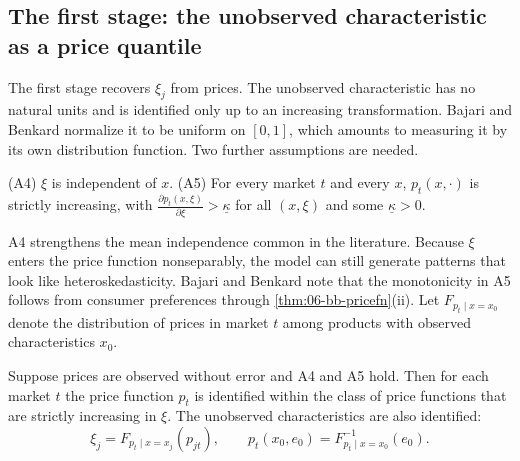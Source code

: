 \subsection{The first stage: the unobserved characteristic as a price quantile}\label{sec:06-bb-firststage}

The first stage recovers $\xi_j$ from prices. The unobserved characteristic has no natural units and is identified only up
to an increasing transformation. Bajari and Benkard normalize it to be uniform on $[0,1]$, which amounts to measuring it by
its own distribution function. Two further assumptions are needed.

\begin{assumption}\label{ass:06-bb-indep}
(A4) $\xi$ is independent of $x$. (A5) For every market $t$ and every $x$, $p_t(x, \cdot)$ is strictly increasing, with
$\frac{\partial p_t(x, \xi)}{\partial \xi} > \underline{\kappa}$ for all $(x, \xi)$ and some $\underline{\kappa} > 0$.
\end{assumption}

A4 strengthens the mean independence common in the literature. Because $\xi$ enters the price function
nonseparably, the model can still generate patterns that look like heteroskedasticity. Bajari and Benkard note that the
monotonicity in A5 follows from consumer preferences through \cref{thm:06-bb-pricefn}(ii). Let $F_{p_t \mid x = x_0}$ denote the distribution of
prices in market $t$ among products with observed characteristics $x_0$.

\begin{theorem}\label{thm:06-bb-xi}
Suppose prices are observed without error and A4 and A5 hold. Then for each market $t$ the price function $p_t$ is
identified within the class of price functions that are strictly increasing in $\xi$. The unobserved characteristics are
also identified:
\begin{equation}\label{eq:06-bb-xi}
  \xi_j = F_{p_t \mid x = x_j}(p_{jt}), \qquad p_t(x_0, e_0) = F^{-1}_{p_t \mid x = x_0}(e_0) .
\end{equation}
\end{theorem}

